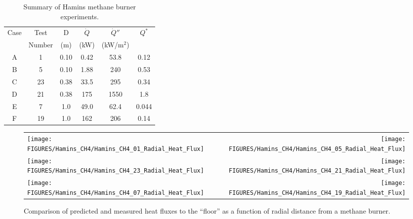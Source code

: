 \begin{table}[ht]
\caption{Summary of Hamins methane burner experiments. }
\vspace{\baselineskip}
\begin{center}
\begin{tabular}{|c|c|c|c|c|c|}
\hline
Case     & Test     & D    & $\dot{Q}$   &  $\dot{Q}''$   & $Q^*$   \\
         & Number   & (m)  & (kW)        &  (kW/m$^2$)    &         \\ \hline \hline
A        & 1        & 0.10 & 0.42        &  53.8          & 0.12    \\ \hline
B        & 5        & 0.10 & 1.88        &  240           & 0.53    \\ \hline
C        & 23       & 0.38 & 33.5        &  295           & 0.34    \\ \hline
D        & 21       & 0.38 & 175         &  1550          & 1.8     \\ \hline
E        & 7        & 1.0  & 49.0        &  62.4          & 0.044   \\ \hline
F        & 19       & 1.0  & 162         &  206           & 0.14    \\ \hline
\end{tabular}
\end{center}
\label{Hamins_Table}
\end{table}

\begin{figure}[p]
\begin{tabular*}{\textwidth}{l@{\extracolsep{\fill}}r}
\texttt{[image: FIGURES/Hamins\_CH4/Hamins\_CH4\_01\_Radial\_Heat\_Flux]} &
\texttt{[image: FIGURES/Hamins\_CH4/Hamins\_CH4\_05\_Radial\_Heat\_Flux]} \\
\texttt{[image: FIGURES/Hamins\_CH4/Hamins\_CH4\_23\_Radial\_Heat\_Flux]} &
\texttt{[image: FIGURES/Hamins\_CH4/Hamins\_CH4\_21\_Radial\_Heat\_Flux]} \\
\texttt{[image: FIGURES/Hamins\_CH4/Hamins\_CH4\_07\_Radial\_Heat\_Flux]} &
\texttt{[image: FIGURES/Hamins\_CH4/Hamins\_CH4\_19\_Radial\_Heat\_Flux]}
\end{tabular*}
\label{Hamins_CH4_Radial}
\caption{Comparison of predicted and measured heat fluxes to the ``floor'' as a function of radial distance from a methane burner.}
\end{figure}

